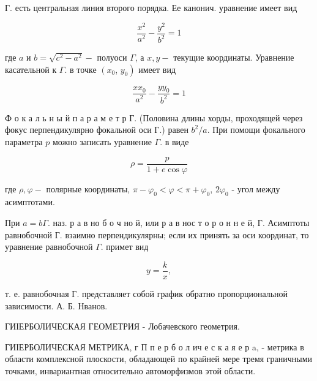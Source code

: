 \documentclass[10pt]{article}
\begin{document}
Г. есть центральная линия второго порядка. Ее канонич. уравнение имеет вид



\[

\frac{x^{2}}{a^{2}}-\frac{y^{2}}{b^{2}}=1

\]



где $a$ и $b=\sqrt{c^{2}-a^{2}}-$ полуоси $\Gamma$, а $x, y-$ текущие координаты. Уравнение касательной к $\Gamma$. в точке $\left(x_{0}\right.$, $\left.y_{0}\right)$ имеет вид



\[

\frac{x x_{0}}{a^{2}}-\frac{y y_{0}}{b^{2}}=1

\]



Ф о к а л ь н ы й п а р а м е т р Г. (Половина длины хорды, проходящей через фокус перпендикулярно фокальной оси Г.) равен $b^{2} / a$. При помощи фокального параметра $p$ можно записать уравнение $\Gamma$. в виде



\[

\rho=\frac{p}{1+e \cos \varphi}

\]



где $\rho, \varphi-$ полярные координаты, $\pi-\varphi_{0}<\varphi<\pi+\varphi_{0}$, $2 \varphi_{0}$ - угол между асимптотами.



При $a=b \Gamma$. наз. р а в но б о ч но й, или р а в нос т о р о н н е й, Г. Асимптоты равнобочной Г. взаимно перпендикулярны; если их принять за оси координат, то уравнение равнобочной $\Gamma$. примет вид



\[

y=\frac{k}{x},

\]



т. е. равнобочная Г. представляет собой график обратно пропорциональной зависимости. А. Б. Нванов.



ГИІЕРБОЛИЧЕСКАЯ ГЕОМЕТРИЯ - Лобачевского геометрия.



ГИІЕРБОЛИЧЕСКАЯ МЕТРИКА, г П п е р б о л ич е с к а я е р a, - метрика в области комплексной плоскости, обладающей по крайней мере тремя граничными точками, инвариантная относительно автоморфизмов этой области.
\end{document}
